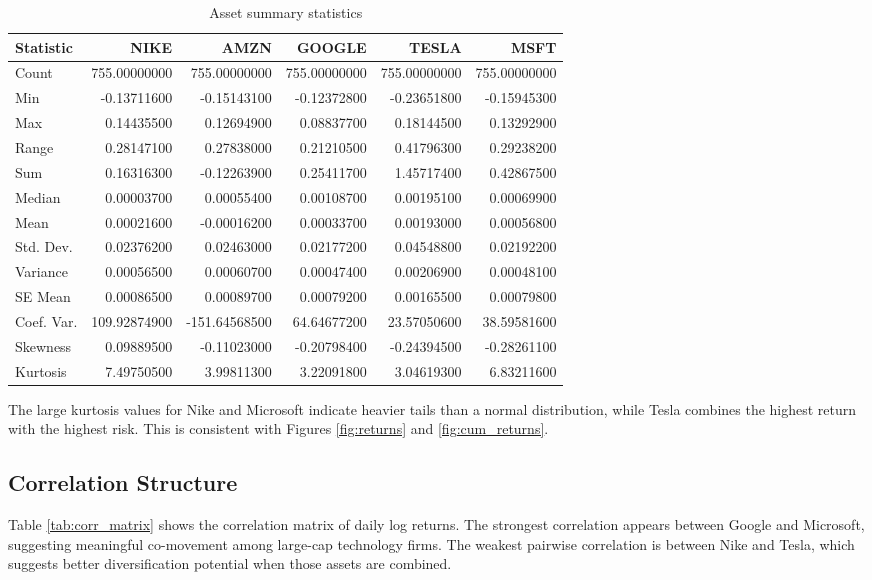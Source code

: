 \documentclass[wcp]{jmlr}
\begin{document}
\begin{abstract - TEST}
\begin{table}[H]
\centering
\caption{Asset summary statistics}
\label{tab:asset_summary}
\small
\begin{tabular}{lrrrrr}
\toprule
Statistic & NIKE & AMZN & GOOGLE & TESLA & MSFT \\
\midrule
Count     & 755.00000000 & 755.00000000 & 755.00000000 & 755.00000000 & 755.00000000 \\
Min       & -0.13711600 & -0.15143100 & -0.12372800 & -0.23651800 & -0.15945300 \\
Max       &  0.14435500 &  0.12694900 &  0.08837700 &  0.18144500 &  0.13292900 \\
Range     &  0.28147100 &  0.27838000 &  0.21210500 &  0.41796300 &  0.29238200 \\
Sum       &  0.16316300 & -0.12263900 &  0.25411700 &  1.45717400 &  0.42867500 \\
Median    &  0.00003700 &  0.00055400 &  0.00108700 &  0.00195100 &  0.00069900 \\
Mean      &  0.00021600 & -0.00016200 &  0.00033700 &  0.00193000 &  0.00056800 \\
Std. Dev. &  0.02376200 &  0.02463000 &  0.02177200 &  0.04548800 &  0.02192200 \\
Variance  &  0.00056500 &  0.00060700 &  0.00047400 &  0.00206900 &  0.00048100 \\
SE Mean   &  0.00086500 &  0.00089700 &  0.00079200 &  0.00165500 &  0.00079800 \\
Coef. Var.& 109.92874900 & -151.64568500 & 64.64677200 & 23.57050600 & 38.59581600 \\
Skewness  &  0.09889500 & -0.11023000 & -0.20798400 & -0.24394500 & -0.28261100 \\
Kurtosis  &  7.49750500 &  3.99811300 &  3.22091800 &  3.04619300 &  6.83211600 \\
\bottomrule
\end{tabular}
\end{table}

The large kurtosis values for Nike and Microsoft indicate heavier tails than a normal distribution, while Tesla combines the highest return with the highest risk. This is consistent with Figures \ref{fig:returns} and \ref{fig:cum_returns}.

\subsection{Correlation Structure}

Table \ref{tab:corr_matrix} shows the correlation matrix of daily log returns. The strongest correlation appears between Google and Microsoft, suggesting meaningful co-movement among large-cap technology firms. The weakest pairwise correlation is between Nike and Tesla, which suggests better diversification potential when those assets are combined.


\end{abstract - TEST}
\end{document}
